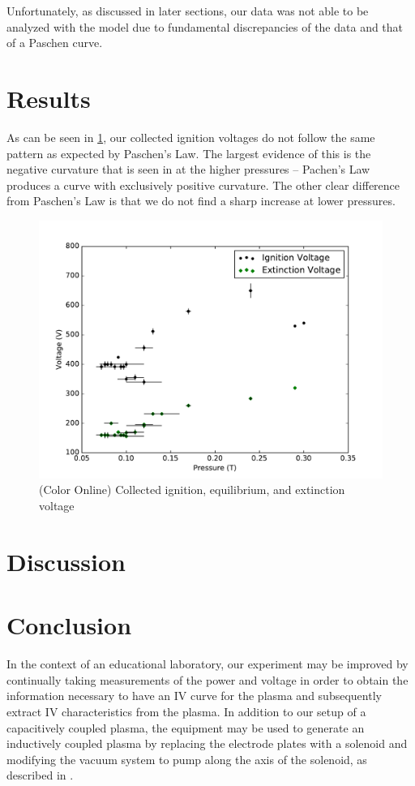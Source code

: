 \documentclass[reprint]{revtex4-1}
\begin{document}
Unfortunately, as discussed in later sections, our data was not able to be analyzed with the model due to fundamental discrepancies of the data and that of a Paschen curve.

\section{Results}

As can be seen in \cref{fig:ignition-extinction}, our collected ignition voltages do not follow the same pattern as expected by Paschen's Law. The largest evidence of this is the negative curvature that is seen in at the higher pressures -- Pachen's Law produces a curve with exclusively positive curvature. The other clear difference from Paschen's Law is that we do not find a sharp increase at lower pressures.

\begin{figure}[h]
\includegraphics[width=\columnwidth]{../resources/ignition-extinction.pdf}
\caption{(Color Online) Collected ignition, equilibrium, and extinction voltage}
\label{fig:ignition-extinction}
\end{figure}

\section{Discussion}



\section{Conclusion}

In the context of an educational laboratory, our experiment may be improved by continually taking measurements of the power and voltage in order to obtain the information necessary to have an IV curve for the plasma and subsequently extract IV characteristics from the plasma. In addition to our setup of a capacitively coupled plasma,  the equipment may be used to generate an inductively coupled plasma by replacing the electrode plates with a solenoid and modifying the vacuum system to pump along the axis of the solenoid, as described in \cite{physics-radio-frequency,Jiayin2010}.


\end{document}
